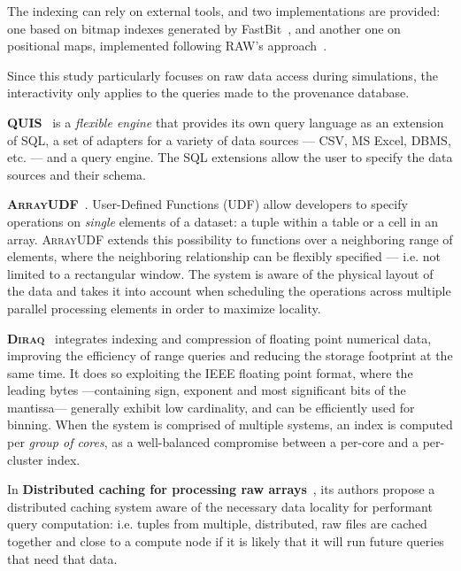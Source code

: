 The indexing can rely on external tools, and two implementations are provided:
one based on bitmap indexes generated by FastBit~\cite{Wu2009},
and another one on positional maps, implemented following \textsc{RAW}'s 
approach~\cite{Karpathiotakis2014}.

Since this study particularly focuses on raw data access during simulations, the 
interactivity only applies to the queries made to the provenance database.

\medskip

\textbf{\textsc{QUIS}}~\cite{10.14778/3137765.3137798} is a \emph{flexible engine} that
provides its own query language as an extension of SQL, a set of adapters for a variety of
data sources --- \gls{CSV}, MS Excel, \gls{DBMS}, etc. --- and a query engine. The SQL
extensions allow the user to specify the data sources and their schema.

\medskip

\textbf{\textsc{ArrayUDF}}~\cite{10.1145/3078597.3078599}. User-Defined Functions (UDF)
allow developers to specify operations on \emph{single} elements of a dataset: a tuple within
a table or a cell in an array. \textsc{ArrayUDF} extends this possibility to functions over
a neighboring range of elements, where the neighboring relationship can be flexibly specified
--- i.e. not limited to a rectangular window. The system is aware of the physical layout of the data
and takes it into account when scheduling the operations across multiple parallel processing elements
in order to maximize locality.

\medskip

\textbf{\textsc{Diraq}}~\cite{10.1145/2462902.2465527} integrates indexing and compression of floating
point numerical data, improving the efficiency of range queries and reducing the storage footprint
at the same time. It does so exploiting the IEEE floating point format, where the leading bytes
---containing sign, exponent and most significant bits of the mantissa--- generally exhibit low
cardinality, and can be efficiently used for binning. When the system is comprised of multiple systems,
an index is computed per \emph{group of cores}, as a well-balanced compromise between a per-core and a
per-cluster index.

\medskip

In \textbf{Distributed caching for processing raw arrays}~\cite{zhao_distributed_2018}, its
authors propose a distributed caching system aware of the necessary data locality for performant
query computation: i.e. tuples from multiple, distributed, raw files are cached together and close
to a compute node if it is likely that it will run future queries that need that data.

